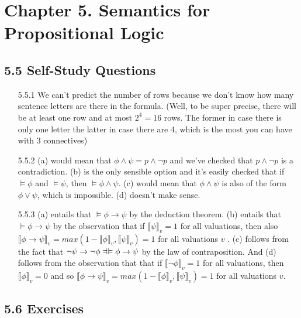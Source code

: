 \chapter{Chapter 5. Semantics for Propositional Logic}

\section*{5.5 Self-Study Questions}



	\begin{enumerate}
	
		\item[5.5.1] We can't predict the number of rows because we don't know how many sentence letters are there in the formula.  (Well, to be super precise, there will be at least one row and at most $2^4=16$ rows. The former in case there is only one letter the latter in case there are 4, which is the most you can have with 3 connectives)
		
		
		\item[5.5.2] (a) would mean that $\phi\land\psi=p\land\neg p$ and we've checked that $p\land\neg p$ is a contradiction. (b) is the only sensible option and it's easily checked that if $\vDash \phi$ and $\vDash\psi$, then $\vDash\phi\land \psi$. (c) would mean that $\phi\land\psi$ is also of the form $\phi\lor\psi$, which is impossible. (d) doesn't make sense. 
	
		\item[5.5.3] (a) entails that $\vDash\phi\to\psi$ by the deduction theorem. (b) entails that $\vDash\phi\to\psi$ by the observation that if $\llbracket\psi\rrbracket_v=1$ for all valuations, then also $\llbracket \phi\to\psi\rrbracket_v=max(1-\llbracket\phi\rrbracket_v,\llbracket\psi\rrbracket_v)=1$ for all valuations $v$ . (c) follows from the fact that $\neg\psi\to\neg\phi\equi\phi\to\psi$ by the law of contraposition. And (d) follows from the observation that that if $\llbracket\neg \phi\rrbracket_v=1$ for all valuations, then $\llbracket \phi\rrbracket_v=0$ and so $\llbracket \phi\to\psi\rrbracket_v=max(1-\llbracket\phi\rrbracket_v,\llbracket\psi\rrbracket_v)=1$ for all valuations $v$.
	
	\end{enumerate}

\section*{5.6 Exercises}

